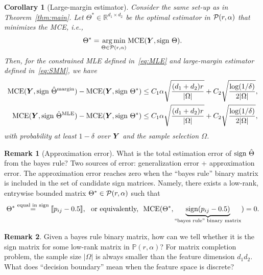 \documentclass[11pt]{article}
\theoremstyle{plain}
\newtheorem{cor}{Corollary}
\theoremstyle{definition}
\newtheorem{rmk}{Remark}
\def\marginest{\hat \Theta^{\textup{margin}}}
\def\MLEest{\hat \Theta^{\textup{MLE}}}
\def\sign{\textup{sign }}
\newcommand*{\KeepStyleUnderBrace}[1]{%
  \mathop{%
    \mathchoice
    {\underbrace{\displaystyle#1}}%
    {\underbrace{\textstyle#1}}%
    {\underbrace{\scriptstyle#1}}%
    {\underbrace{\scriptscriptstyle#1}}%
  }\limits
}
\begin{document}
\begin{cor}[Large-margin estimator] Consider the same set-up as in Theorem~\ref{thm:main}. Let $\Theta^*\in\mathbb{R}^{d_1\times d_2}$ be the optimal estimator in $\mathcal{P}(r,\alpha)$ that minimizes the MCE, i.e., 
\[
\Theta^*=\argmin_{\Theta\in\tP(r,\alpha)}\textup{MCE}(\mY, \sign\Theta).
\] Then, for the constrained MLE defined in~\eqref{eq:MLE} and large-margin estimator defined in~\eqref{eq:SMM}, we have
\begin{align}
\textup{MCE}(\mY, \sign\marginest)- \textup{MCE}(\mY, \sign\Theta^*) & \leq C_1\alpha\sqrt{(d_1+d_2)r\over |\Omega|}+C_2\sqrt{\log(1/\delta)\over 2|\Omega|},\\
\textup{MCE}(\mY, \sign\MLEest)- \textup{MCE}(\mY, \sign\Theta^*)  & \leq C_1\alpha\sqrt{(d_1+d_2)r\over |\Omega|}+C_2\sqrt{\log(1/\delta)\over 2|\Omega|},
\end{align}
with probability at least $1-\delta$ over $\bm Y$ and the sample selection $\Omega$.
\end{cor}


\begin{rmk}[Approximation error]
What is the total estimation error of $\sign \hat \Theta$ from the bayes rule? Two sources of error: generalization error + approximation error. The approximation error reaches zero when the ``bayes rule'' binary matrix is included in the set of candidate sign matrices. Namely, there exists a low-rank, entrywise bounded matrix $\Theta^*\in\mathcal{P}(r,\alpha)$ such that 
\[
\Theta^*\stackrel{\text{equal in sign}}{=}\entry{p_{ij}-0.5},\  \text{ or equivalently, }\ \textup{MCE}(\Theta^*, \KeepStyleUnderBrace{\text{sign}(p_{ij}-0.5)}_{\text{``bayes rule'' binary matrix}})=0.
\]
\end{rmk}

\begin{rmk}
Given a bayes rule binary matrix, how can we tell whether it is the sign matrix for some low-rank matrix in $\mathbb{P}(r,\alpha)$? For matrix completion problem, the sample size $|\Omega|$ is always smaller than the feature dimension $d_1d_2$. {\color{red}What does ``decision boundary'' mean when the feature space is discrete?} 
\end{rmk}
\end{document}
